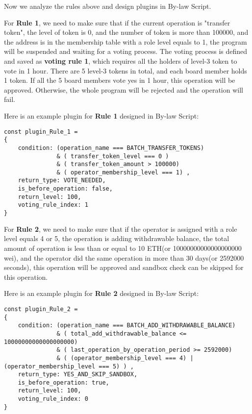 \documentclass[main.tex]{subfiles}
\begin{document}
Now we analyze the rules above and design plugins in By-law Script.

For \textbf{Rule 1}, we need to make sure that if the current operation is "transfer token", the level of token is 0, and the number of token is more than 100000, and the address is in the membership table with a role level equals to 1, the program will be suspended and waiting for a voting process. The voting process is defined and saved as \textbf{voting rule 1}, which requires all the holders of level-3 token to vote in 1 hour. There are 5 level-3 tokens in total, and each board member holds 1 token. If all the 5 board members vote yes in 1 hour, this operation will be approved. Otherwise, the whole program will be rejected and the operation will fail.

Here is an example plugin for \textbf{Rule 1} designed in By-law Script:

\begin{verbatim}
const plugin_Rule_1 = 
{
    condition: (operation_name === BATCH_TRANSFER_TOKENS)
               & ( transfer_token_level === 0 )
               & ( transfer_token_amount > 100000) 
               & ( operator_membership_level === 1) ,
    return_type: VOTE_NEEDED,
    is_before_operation: false,
    return_level: 100,
    voting_rule_index: 1
}
\end{verbatim}

For \textbf{Rule 2}, we need to make sure that if the operator is assigned with a role level equals 4 or 5, the operation is adding withdrawable balance, the total amount of operation is less than or equal to 10 ETH(or 10000000000000000000 wei), and the operator did the same operation in more than 30 days(or 2592000 seconds), this operation will be approved and sandbox check can be skipped for this operation.

Here is an example plugin for \textbf{Rule 2} designed in By-law Script:

\begin{verbatim}
const plugin_Rule_2 = 
{
    condition: (operation_name === BATCH_ADD_WITHDRAWABLE_BALANCE)
               & ( total_add_withdrawable_balance <= 10000000000000000000)
               & ( last_operation_by_operation_period >= 2592000) 
               & ( (operator_membership_level === 4) | (operator_membership_level === 5) ) ,
    return_type: YES_AND_SKIP_SANDBOX,
    is_before_operation: true,
    return_level: 100,
    voting_rule_index: 0
}
\end{verbatim}
\end{document}
